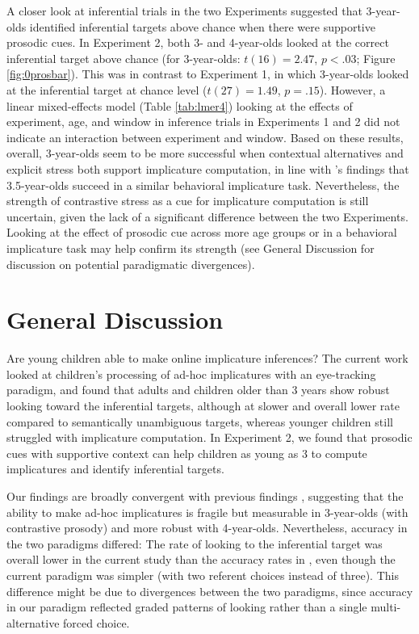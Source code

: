 \documentclass[10pt,letterpaper]{article}
\begin{document}
A closer look at inferential trials in the two Experiments suggested that 3-year-olds identified inferential targets above chance when there were supportive prosodic cues. In Experiment 2, both 3- and 4-year-olds looked at the correct inferential target above chance (for 3-year-olds: $t(16) = 2.47$, $p < .03$; Figure \ref{fig:0prosbar}). This was in contrast to Experiment 1, in which 3-year-olds looked at the inferential target at chance level ($t(27) = 1.49$, $p = .15$). However, a linear mixed-effects model (Table \ref{tab:lmer4}) looking at the effects of experiment, age, and window in inference trials in Experiments 1 and 2 did not indicate an interaction between experiment and window. Based on these results, overall, 3-year-olds seem to be more successful when contextual alternatives and explicit stress both support implicature computation, in line with 's findings that 3.5-year-olds succeed in a similar behavioral implicature task. Nevertheless, the strength of contrastive stress as a cue for implicature computation is still uncertain, given the lack of a significant difference between the two Experiments. Looking at the effect of prosodic cue across more age groups or in a behavioral implicature task may help confirm its strength (see General Discussion for discussion on potential paradigmatic divergences). 

\section{General Discussion}

Are young children able to make online implicature inferences? The current work looked at children's processing of ad-hoc implicatures with an eye-tracking paradigm, and found that adults and children older than 3 years show robust looking toward the inferential targets, although at slower and overall lower rate compared to semantically unambiguous targets, whereas younger children still struggled with implicature computation. In Experiment 2, we found that prosodic cues with supportive context can help children as young as 3 to compute implicatures and identify inferential targets.

Our findings are broadly convergent with previous findings \cite{stillerLLD}, suggesting that the ability to make ad-hoc implicatures is fragile but measurable in 3-year-olds (with contrastive prosody) and more robust with 4-year-olds. Nevertheless, accuracy in the two paradigms differed: The rate of looking to the inferential target was overall lower in the current study than the accuracy rates in , even though the current paradigm was simpler (with two referent choices instead of three). This difference might be due to divergences between the two paradigms, since accuracy in our paradigm reflected graded patterns of looking rather than a single multi-alternative forced choice. 
\end{document}
